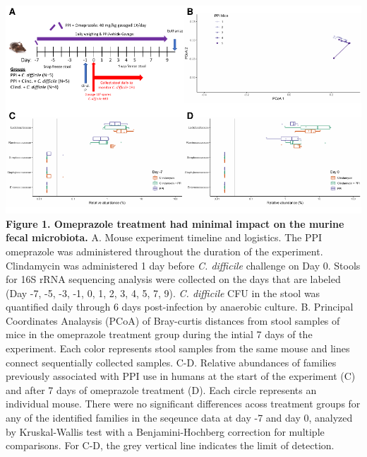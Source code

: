 \documentclass[11pt,]{article}
\begin{document}
\includegraphics{figure_1.pdf} \textbf{Figure 1. Omeprazole treatment
had minimal impact on the murine fecal microbiota.} A. Mouse experiment
timeline and logistics. The PPI omeprazole was administered throughout
the duration of the experiment. Clindamycin was administered 1 day
before \emph{C. difficile} challenge on Day 0. Stools for 16S rRNA
sequencing analysis were collected on the days that are labeled (Day -7,
-5, -3, -1, 0, 1, 2, 3, 4, 5, 7, 9). \emph{C. difficile} CFU in the
stool was quantified daily through 6 days post-infection by anaerobic
culture. B. Principal Coordinates Analaysis (PCoA) of Bray-curtis
distances from stool samples of mice in the omeprazole treatment group
during the intial 7 days of the experiment. Each color represents stool
samples from the same mouse and lines connect sequentially collected
samples. C-D. Relative abundances of families previously associated with
PPI use in humans at the start of the experiment (C) and after 7 days of
omeprazole treatment (D). Each circle represents an individual mouse.
There were no significant differences acoss treatment groups for any of
the identified families in the seqeunce data at day -7 and day 0,
analyzed by Kruskal-Wallis test with a Benjamini-Hochberg correction for
multiple comparisons. For C-D, the grey vertical line indicates the
limit of detection.

\newpage
\end{document}
